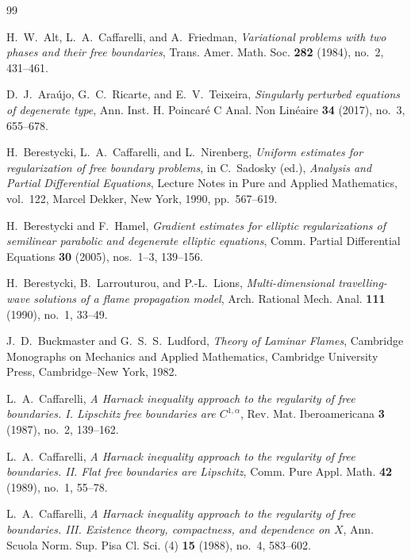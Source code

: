 \documentclass[11pt,letterpaper]{amsart}
\numberwithin{equation}{section}
\theoremstyle{definition}
\theoremstyle{remark}
\begin{document}
\begin{thebibliography}{99}


H.~W.~Alt, L.~A.~Caffarelli, and A.~Friedman,
\emph{Variational problems with two phases and their free boundaries},
Trans. Amer. Math. Soc. \textbf{282} (1984), no.~2, 431--461.

D.~J.~Ara\'ujo, G.~C.~Ricarte, and E.~V.~Teixeira,
\emph{Singularly perturbed equations of degenerate type},
Ann. Inst. H. Poincar\'e C Anal. Non Lin\'eaire \textbf{34} (2017), no.~3,
655--678.

H.~Berestycki, L.~A.~Caffarelli, and L.~Nirenberg,
\emph{Uniform estimates for regularization of free boundary problems},
in C.~Sadosky (ed.), \emph{Analysis and Partial Differential Equations},
Lecture Notes in Pure and Applied Mathematics, vol.~122,
Marcel Dekker, New York, 1990, pp.~567--619.

H.~Berestycki and F.~Hamel,
\emph{Gradient estimates for elliptic regularizations of semilinear parabolic
and degenerate elliptic equations},
Comm. Partial Differential Equations \textbf{30} (2005), nos.~1--3, 139--156.

H.~Berestycki, B.~Larrouturou, and P.-L.~Lions,
\emph{Multi-dimensional travelling-wave solutions of a flame propagation
model},
Arch. Rational Mech. Anal. \textbf{111} (1990), no.~1, 33--49.

J.~D.~Buckmaster and G.~S.~S.~Ludford,
\emph{Theory of Laminar Flames},
Cambridge Monographs on Mechanics and Applied Mathematics,
Cambridge University Press, Cambridge--New York, 1982.

L.~A.~Caffarelli,
\emph{A Harnack inequality approach to the regularity of free boundaries.
I. Lipschitz free boundaries are $C^{1,\alpha}$},
Rev. Mat. Iberoamericana \textbf{3} (1987), no.~2, 139--162.

L.~A.~Caffarelli,
\emph{A Harnack inequality approach to the regularity of free boundaries.
II. Flat free boundaries are Lipschitz},
Comm. Pure Appl. Math. \textbf{42} (1989), no.~1, 55--78.

L.~A.~Caffarelli,
\emph{A Harnack inequality approach to the regularity of free boundaries.
III. Existence theory, compactness, and dependence on $X$},
Ann. Scuola Norm. Sup. Pisa Cl. Sci. (4) \textbf{15} (1988), no.~4,
583--602.


\end{thebibliography}
\end{document}
